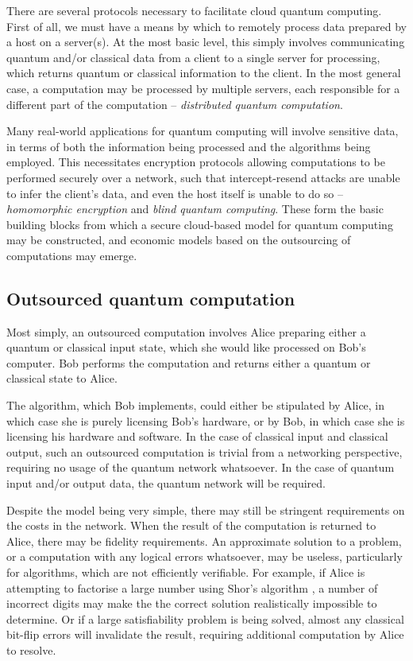 \documentclass[aps,rmp,twocolumn,amsmath,amssymb,nofootinbib,superscriptaddress,longbibliography,floatfix]{revtex4-1}
\begin{document}
There are several protocols necessary to facilitate cloud quantum computing. First of all, we must have a means by which to remotely process data prepared by a host on a server(s). At the most basic level, this simply involves communicating quantum and/or classical data from a client to a single server for processing, which returns quantum or classical information to the client. In the most general case, a computation may be processed by multiple servers, each responsible for a different part of the computation -- \emph{distributed quantum computation}.

Many real-world applications for quantum computing will involve sensitive data, in terms of both the information being processed and the algorithms being employed. This necessitates encryption protocols allowing computations to be performed securely over a network, such that intercept-resend attacks are unable to infer the client's data, and even the host itself is unable to do so -- \emph{homomorphic encryption} and \emph{blind quantum computing}. These form the basic building blocks from which a secure cloud-based model for quantum computing may be constructed, and economic models based on the outsourcing of computations may emerge.

%
%

\subsection{Outsourced quantum computation}

Most simply, an outsourced computation involves Alice preparing either a quantum or classical input state, which she would like processed on Bob's computer. Bob performs the computation and returns either a quantum or classical state to Alice.

The algorithm, which Bob implements, could either be stipulated by Alice, in which case she is purely licensing Bob's hardware, or by Bob, in which case she is licensing his hardware and software. In the case of classical input and classical output, such an outsourced computation is trivial from a networking perspective, requiring no usage of the quantum network whatsoever. In the case of quantum input and/or output data, the quantum network will be required.

Despite the model being very simple, there may still be stringent requirements on the costs in the network. When the result of the computation is returned to Alice, there may be fidelity requirements. An approximate solution to a problem, or a computation with any logical errors whatsoever, may be useless, particularly for algorithms, which are not efficiently verifiable. For example, if Alice is attempting to factorise a large number using Shor's algorithm \cite{bib:ShorFactor}, a number of incorrect digits may make the the correct solution realistically impossible to determine. Or if a large satisfiability problem is being solved, almost any classical bit-flip errors will invalidate the result, requiring additional computation by Alice to resolve.
\end{document}

